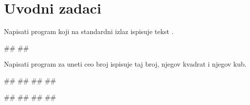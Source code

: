 \renewcommand{\chaptermark}[1]{\markboth{\thechapter\ #1}{#1}}
\renewcommand{\sectionmark}[1]{\markright{\thesection\ #1}}


\chapter{Uvodni zadaci}


\setcounter{page}{1}



\begin{Exercise}[label=v1.1_01] 
Napisati program koji na standardni izlaz ispisuje tekst .

\begin{miditest}
\begin{upotreba}{1}
#\naslovInt#
##
\end{upotreba}
\end{miditest}

\end{Exercise}
\begin{Answer}[ref=v1.1_01]
\end{Answer}




\begin{Exercise}[label=p1.1_01] 
Napisati program za uneti ceo broj ispisuje taj broj, njegov kvadrat i njegov kub. 

\begin{miditest}
\begin{upotreba}{1}
#\naslovInt#
##
##
##
\end{upotreba}
\end{miditest}
\begin{miditest}
\begin{upotreba}{2}
#\naslovInt#
##
##
##
\end{upotreba}
\end{miditest}

\end{Exercise}
\begin{Answer}[ref=p1.1_01]
\end{Answer}


